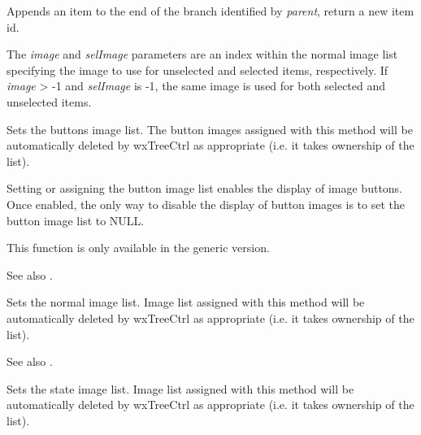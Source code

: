 \label{wxtreectrlappenditem}


Appends an item to the end of the branch identified by {\it parent}, return a new item id.

The {\it image} and {\it selImage} parameters are an index within
the normal image list specifying the image to use for unselected and
selected items, respectively.
If {\it image} > -1 and {\it selImage} is -1, the same image is used for
both selected and unselected items.

\label{wxtreectrlassignbuttonsimagelist}


Sets the buttons image list. The button images assigned with this method will
be automatically deleted by wxTreeCtrl as appropriate
(i.e. it takes ownership of the list).

Setting or assigning the button image list enables the display of image buttons.
Once enabled, the only way to disable the display of button images is to set
the button image list to NULL.

This function is only available in the generic version.

See also .

\label{wxtreectrlassignimagelist}


Sets the normal image list. Image list assigned with this method will
be automatically deleted by wxTreeCtrl as appropriate
(i.e. it takes ownership of the list).

See also .

\label{wxtreectrlassignstateimagelist}


Sets the state image list. Image list assigned with this method will
be automatically deleted by wxTreeCtrl as appropriate
(i.e. it takes ownership of the list).

